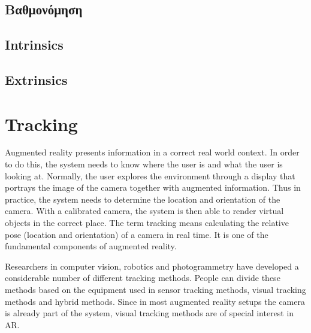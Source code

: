 \subsection{Βαθμονόμηση}

\subsection{Intrinsics}
\subsection{Extrinsics}




\section{Tracking}
Augmented reality presents information in a correct real world context. In order to do this, the system needs to know where the user is and what the user is looking at. Normally, the user explores the environment through a display that portrays the image of the camera together with augmented information. Thus in practice, the system needs to determine the location and orientation of the camera. With a calibrated camera, the system is then able to render virtual objects in the correct place. The term tracking means calculating the relative pose (location and orientation) of a camera in real time. It is one of the fundamental components of augmented reality.

Researchers in computer vision, robotics and photogrammetry have developed a considerable number of different tracking methods. People can divide these methods based on the equipment used in sensor tracking methods, visual tracking methods and hybrid methods. Since in most augmented reality setups the camera is already part of the system, visual tracking methods are of special interest in AR.

